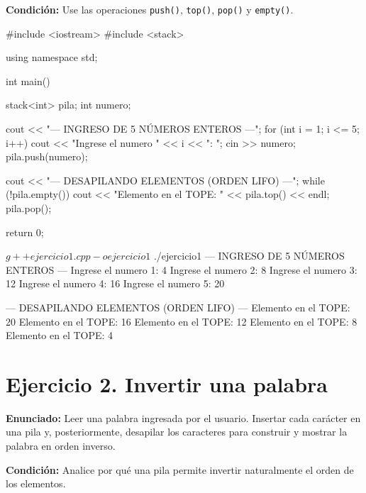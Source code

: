 \documentclass[11pt, a4paper]{article}
\begin{document}
\textbf{Condición:} Use las operaciones \texttt{push()}, \texttt{top()}, \texttt{pop()} y \texttt{empty()}.

\begin{codebox}[title={CÓDIGO FUENTE: Ejercicio 1}]
#include <iostream>
#include <stack>

using namespace std;

int main() {
    stack<int> pila;
    int numero;

    cout << "--- INGRESO DE 5 NÚMEROS ENTEROS ---\n";
    for (int i = 1; i <= 5; i++) {
        cout << "Ingrese el numero " << i << ": ";
        cin >> numero;
        pila.push(numero);
    }

    cout << "\n--- DESAPILANDO ELEMENTOS (ORDEN LIFO) ---\n";
    while (!pila.empty()) {
        cout << "Elemento en el TOPE: " << pila.top() << endl;
        pila.pop();
    }

    return 0;
}
\end{codebox}

\begin{terminalout}
$ g++ ejercicio1.cpp -o ejercicio1
$ ./ejercicio1
--- INGRESO DE 5 NÚMEROS ENTEROS ---
Ingrese el numero 1: 4
Ingrese el numero 2: 8
Ingrese el numero 3: 12
Ingrese el numero 4: 16
Ingrese el numero 5: 20

--- DESAPILANDO ELEMENTOS (ORDEN LIFO) ---
Elemento en el TOPE: 20
Elemento en el TOPE: 16
Elemento en el TOPE: 12
Elemento en el TOPE: 8
Elemento en el TOPE: 4
\end{terminalout}

\newpage

\section*{Ejercicio 2. Invertir una palabra}

\textbf{Enunciado:} Leer una palabra ingresada por el usuario. Insertar cada carácter en una pila y, posteriormente, desapilar los caracteres para construir y mostrar la palabra en orden inverso.

\textbf{Condición:} Analice por qué una pila permite invertir naturalmente el orden de los elementos.
\end{document}
